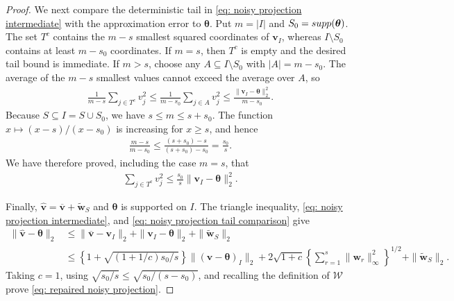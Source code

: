 \documentclass[letterpaper,12pt]{article}
\numberwithin{equation}{section}
\theoremstyle{plain}
\numberwithin{Theorem}{section}
\numberwithin{proposition}{section}
\numberwithin{Lemma}{section}
{
	\theoremstyle{definition}
	\newtheorem{Definition}{Definition}
	\newtheorem{example}{Example}
	\numberwithin{example}{section}
	\newtheorem{fact}{Fact}
	\numberwithin{fact}{section}
	\newtheorem{remark}{Remark}
}
\newcommand{\1}{\mathbbm{1}}
\def\supp{{\rm supp}}
\begin{document}
\begin{proof}
We next compare the deterministic tail in
\eqref{eq: noisy projection intermediate} with the approximation error
to $\bm\theta$.  Put $m=|I|$ and
$S_0=\supp(\bm\theta)$.  The set $T^c$ contains the $m-s$ smallest
squared coordinates of $\bm v_I$, whereas $I\setminus S_0$ contains
at least $m-s_0$ coordinates.  If $m=s$, then $T^c$ is empty and the
desired tail bound is immediate.  If $m>s$, choose any
$A\subseteq I\setminus S_0$ with $|A|=m-s_0$.  The average of the
$m-s$ smallest values cannot exceed the average over $A$, so
\begin{align*}
    \frac{1}{m-s}\sum_{j\in T^c}v_j^2
    \leq
    \frac{1}{m-s_0}\sum_{j\in A}v_j^2
    \leq
    \frac{\|\bm v_I-\bm\theta\|_2^2}{m-s_0}.
\end{align*}
Because $S\subseteq I=S\cup S_0$, we have $s\leq m\leq s+s_0$.
The function $x\mapsto(x-s)/(x-s_0)$ is increasing for $x\geq s$,
and hence
\begin{align*}
    \frac{m-s}{m-s_0}
    \leq\frac{(s+s_0)-s}{(s+s_0)-s_0}
    =\frac{s_0}{s}.
\end{align*}
We have therefore proved, including the case $m=s$, that
\begin{align}
    \sum_{j\in T^c}v_j^2
    \leq\frac{s_0}{s}\|\bm v_I-\bm\theta\|_2^2.           \label{eq: noisy projection tail comparison}
\end{align}

Finally,
$\widehat{\bm v}=\overline{\bm v}+\widetilde{\bm w}_S$ and
$\bm\theta$ is supported on $I$.  The triangle inequality,
\eqref{eq: noisy projection intermediate}, and
\eqref{eq: noisy projection tail comparison} give
\begin{align*}
    \|\widehat{\bm v}-\bm\theta\|_2
    &\leq\|\overline{\bm v}-\bm v_I\|_2
    +\|\bm v_I-\bm\theta\|_2
    +\|\widetilde{\bm w}_S\|_2\\
    &\leq
    \left\{1+\sqrt{(1+1/c)s_0/s}\right\}
    \|(\bm v-\bm\theta)_I\|_2
    +2\sqrt{1+c}\left\{\sum_{r=1}^s
    \|\bm w_r\|_\infty^2\right\}^{1/2}
    +\|\widetilde{\bm w}_S\|_2.
\end{align*}
Taking $c=1$, using
$\sqrt{s_0/s}\leq\sqrt{s_0/(s-s_0)}$, and recalling the definition of
$\mathcal W$ prove \eqref{eq: repaired noisy projection}.
\end{proof}
\end{document}
